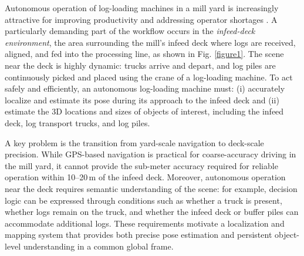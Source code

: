 \documentclass[letterpaper, 10 pt, conference]{IEEEtran}  %
\begin{document}
Autonomous operation of log-loading machines in a mill yard is increasingly attractive for improving productivity and addressing operator shortages \cite{c1}. A particularly demanding part of the workflow occurs in the \emph{infeed-deck environment}, the area surrounding the mill’s infeed deck where logs are received, aligned, and fed into the processing line, as shown in Fig. \ref{figure1}. The scene near the deck is highly dynamic: trucks arrive and depart, and log piles are continuously picked and placed using the crane of a log-loading machine. To act safely and efficiently, an autonomous log-loading machine must: (i) accurately localize and estimate its pose during its approach to the infeed deck and (ii) estimate the 3D locations and sizes of objects of interest, including the infeed deck, log transport trucks, and log piles.

A key problem is the transition from yard-scale navigation to deck-scale precision. While GPS-based navigation is practical for coarse-accuracy driving in the mill yard,  it cannot provide the sub-meter accuracy required for reliable operation within 10--20\,m of the infeed deck. Moreover, autonomous operation near the deck requires semantic understanding of the scene: for example, decision logic can be expressed through conditions such as whether a truck is present, whether logs remain on the truck, and whether the infeed deck or buffer piles can accommodate additional logs. These requirements motivate a localization and mapping system that provides both precise pose estimation and persistent object-level understanding in a common global frame.
\end{document}
